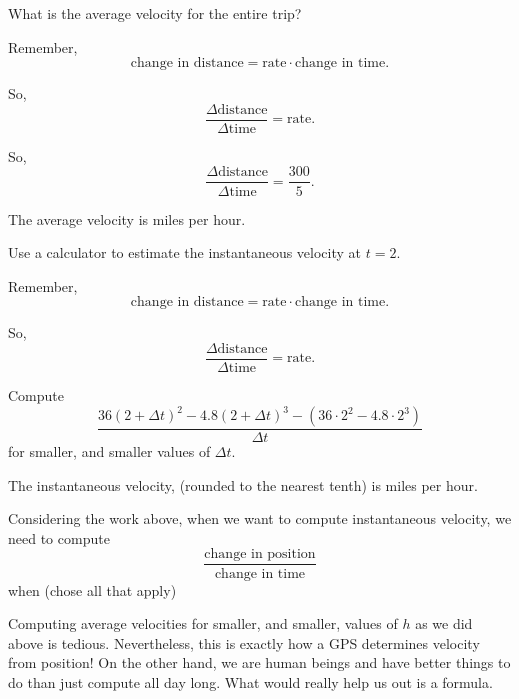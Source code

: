 \documentclass{ximera}
\begin{document}
\begin{problem}
  What is the average velocity for the entire trip?
\begin{hint}
  Remember, 
  \[
  \text{change in distance} = \text{rate}\cdot\text{change in time}.
  \]
\end{hint}
\begin{hint}
  So, 
  \[
  \frac{\Delta\text{distance}}{\Delta\text{time}} = \text{rate}.
  \]
\end{hint}
\begin{hint}
So, 
\[
\frac{\Delta\text{distance}}{\Delta\text{time}} = \frac{300}{5}.
\]
\end{hint}
\begin{prompt}
  The average velocity is  miles per hour.
\end{prompt}
\end{problem}


\begin{problem}
  Use a calculator to estimate the instantaneous velocity at $t=2$.
  \begin{hint}
  Remember, 
  \[
  \text{change in distance} = \text{rate}\cdot\text{change in time}.
  \]
  \end{hint}
  \begin{hint}
  So, 
  \[
  \frac{\Delta\text{distance}}{\Delta\text{time}} = \text{rate}.
  \]
\end{hint}
  \begin{hint}
    Compute
    \[
    \frac{36(2+\Delta t)^2 -4.8(2+\Delta t)^3 -\left(36\cdot 2^2 -4.8\cdot 2^3\right) }{\Delta t}
    \]
    for smaller, and smaller values of $\Delta t$.
\end{hint}
  \begin{prompt}
    The instantaneous velocity, (rounded to the nearest tenth) is  miles per hour.
  \end{prompt}
\end{problem}


\begin{problem}
  Considering the work above, when we want to compute instantaneous
  velocity, we need to compute
  \[
  \frac{\text{change in position}}{\text{change in time}}
  \]
  when (chose all that apply)
  \begin{multipleChoice}%
  \end{multipleChoice}
\end{problem}


Computing average velocities for smaller, and smaller, values of $h$
as we did above is tedious. Nevertheless, this is exactly how a GPS
determines velocity from position! On the other hand, we are human
beings and have better things to do than just compute all day
long. What would really help us out is a formula.




\end{document}
